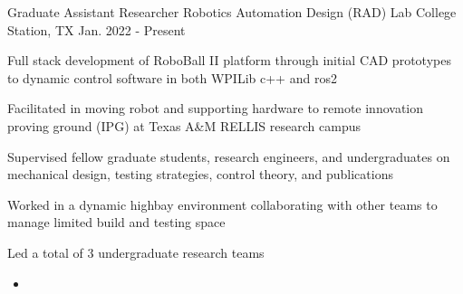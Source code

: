 


\begin{cventries}


\cventry
{Graduate Assistant Researcher} %
{Robotics Automation Design (RAD) Lab} %
{College Station, TX} %
{Jan. 2022 - Present} %
{ %
\begin{cvitems}
\item {Full stack development of RoboBall II platform through initial CAD prototypes to dynamic control software in both WPILib c++ and ros2}
\item {Facilitated in moving robot and supporting hardware to remote innovation proving ground (IPG) at Texas A\&M RELLIS research campus}
\item {Supervised fellow graduate students, research engineers, and undergraduates on mechanical design, testing strategies, control theory, and publications}
\item {Worked in a dynamic highbay environment collaborating with other teams to manage limited build and testing space}
\item {Led a total of 3 undergraduate research teams }
\begin{itemize}
    \item 
\end{itemize}
\end{cvitems}
}



\end{cventries}
